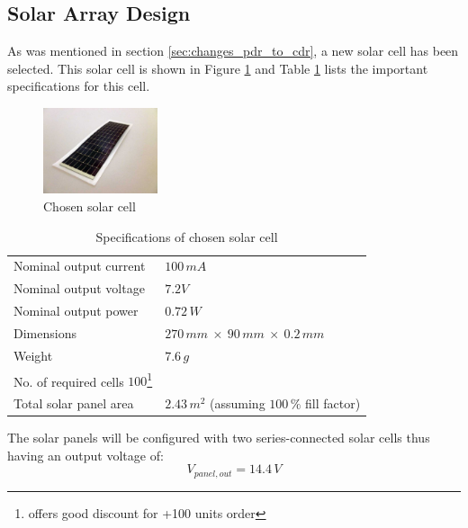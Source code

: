 \subsection{Solar Array Design}
As was mentioned in section \ref{sec:changes_pdr_to_cdr}, a new solar cell has been selected. This solar cell is shown in Figure \ref{fig:solar_cell} and Table \ref{tab:solar_cell_spec} lists the important specifications for this cell.
%
\begin{figure}[H]
\centering
\includegraphics[width=0.3\textwidth]{figures/SolarCell_RC7-2_Powerfilm}
\caption{Chosen solar cell}
\label{fig:solar_cell}
\end{figure}
%
\begin{table}[H]
\centering
\caption{Specifications of chosen solar cell}
\label{tab:solar_cell_spec}
\begin{minipage}{\textwidth}
\begin{tabular}{ll}
\hline
Nominal output current & $100\,mA$\\
Nominal output voltage & $7.2V$\\
Nominal output power & $0.72\,W$\\
Dimensions & $270\,mm\:\times\:90\,mm\:\times\:0.2\,mm$\\
Weight & $7.6\,g$\\
No. of required cells $100$\footnote{\cite{avnetexpress} offers good discount for +100 units order}\\
Total solar panel area & $2.43\,m^2$ (assuming $100\,\%$ fill factor)\\
\hline
\end{tabular}\par
\vspace{-0.75\skip\footins}
\renewcommand{\footnoterule}{}
\end{minipage}
\end{table}
%
%
The solar panels will be configured with two series-connected solar cells thus having an output voltage of: 
%
\begin{equation}
V_{panel,out}=14.4\,V
\end{equation}
%
%
